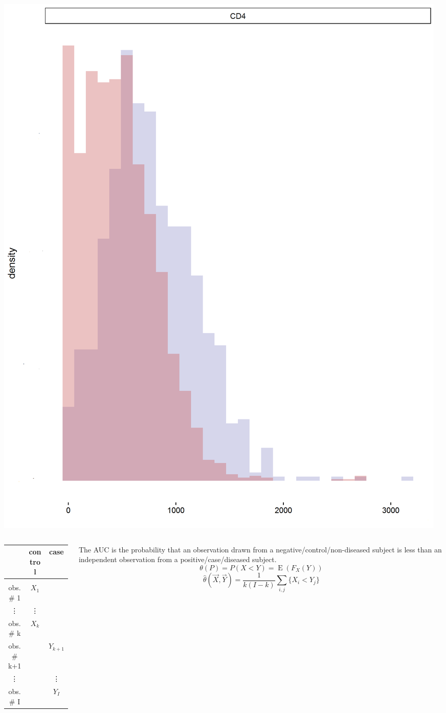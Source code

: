 \documentclass{beamer}
\DeclareMathOperator{\E}{E}
\newcommand{\I}{I}
\renewcommand{\P}{P}
\begin{document}
\begin{frame}
  \centering
  \includegraphics[scale=.22]{fig4.png}
\end{frame}
\begin{frame}
  \begin{columns}
    \begin{column}{.5\textwidth}
  \begin{tabular}{c | c | c}
    & control & case\\
    \hline&&\\
    obs. \# 1 & $X_1$ & \\
    \vdots & \vdots & \\
    obs. \# k & $X_{k}$ &\\
      obs. \# k+1 &  & $Y_{k+1}$\\
     \vdots & & \vdots\\
    obs. \# \I &  & $Y_{\I}$\\
  \end{tabular}
\end{column}
\begin{column}{.5\textwidth}
  The AUC is the probability that an observation drawn from a
  negative/control/non-diseased subject is less than an independent
  observation from a positive/case/diseased subject.
  $$\theta(P)=\P(X < Y)=\E(F_X(Y))$$
  $$\hat{\theta}(\vec X,\vec Y)=\frac{1}{k(\I-k)}\sum_{i,j}\{X_i<Y_j\}$$
\end{column}
\end{columns}
\end{frame}
\end{document}
